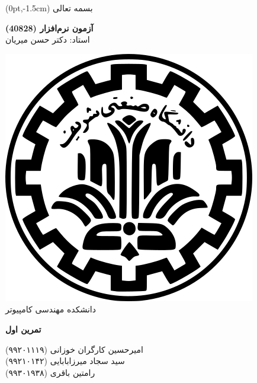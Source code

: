 \documentclass{article}
\newcommand{\Institute}{دانشکده مهندسی کامپیوتر}
\newcommand{\Title}{تمرین اول}
\newcommand{\Class}{آزمون نرم‌افزار}
\newcommand{\Instructor}{دکتر حسن میریان}
\newcommand{\ClassCode}{40828}
\begin{document}
	\begin{textblock*}{\textwidth}(0pt,-1.5cm)
		\centering \small
		بسمه تعالی
	\end{textblock*}
	\begin{minipage}[c]{0.7\textwidth}
		\flushright
		{\Large\bfseries{\Class} (\ClassCode)}\\
		{\small استاد: \Instructor}
	\end{minipage}
	\hfill
	\begin{minipage}[c]{0.17\textwidth}
		\centering
		\includegraphics[width=.6\textwidth]{sharif-logo}\\[-5pt]
		{\scriptsize \Institute}
	\end{minipage}
	\vspace{2ex}
	\begin{titlebox}
		{\Large{\textbf{\Title}}}\hfill
		\parbox{.4\textwidth}{%
			\vspace{-1.3ex}
			\flushleft
			\small
امیرحسین کارگران خوزانی {\footnotesize (۹۹۲۰۱۱۱۹)}\\
سید سجاد میرزابابایی {\footnotesize (۹۹۲۱۰۱۴۲)}\\
رامتین باقری {\footnotesize (۹۹۳۰۱۹۳۸)}
		}
	\end{titlebox}
\end{document}
